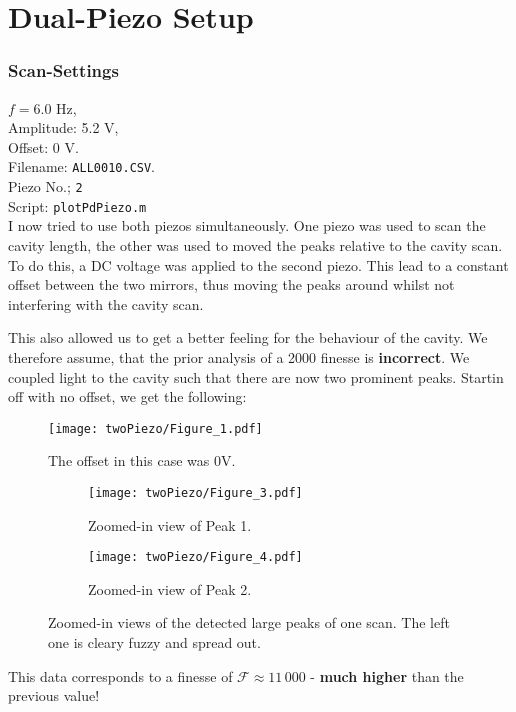 \section{Dual-Piezo Setup}
\subsubsection*{Scan-Settings}
$f = 6.0$ Hz,  \\
Amplitude: 5.2 V,  \\
Offset: 0 V.  \\
Filename: \texttt{ALL0010.CSV}.   \\
Piezo No.; \texttt{2}  \\
Script: \texttt{plotPdPiezo.m} \\

I now tried to use both piezos simultaneously. One piezo was used to scan the cavity length, the other was used to moved the peaks relative to the cavity scan.
To do this, a DC voltage was applied to the second piezo. This lead to a constant offset between the two mirrors, thus moving the peaks around whilst not interfering with the cavity scan.

This also allowed us to get a better feeling for the behaviour of the cavity. 
We therefore assume, that the prior analysis of a 2000 finesse is \textbf{incorrect}.
We coupled light to the cavity such that there are now two prominent peaks.
Startin off with no offset, we get the following:


\begin{figure}[H]
    \centering
    \texttt{[image: twoPiezo/Figure\_1.pdf]}
    \caption{The offset in this case was 0V.}
\end{figure}



\begin{figure}[H]
    \centering
    \begin{subfigure}[t]{0.48\textwidth}
        \centering
        \texttt{[image: twoPiezo/Figure\_3.pdf]}
        \caption{Zoomed-in view of Peak 1.}
        \label{fig:peak1_0v}
    \end{subfigure}
    \hfill
    \begin{subfigure}[t]{0.48\textwidth}
        \centering
        \texttt{[image: twoPiezo/Figure\_4.pdf]}
        \caption{Zoomed-in view of Peak 2.}
        \label{fig:peak2_0v}
    \end{subfigure}
    \caption{Zoomed-in views of the detected large peaks of one scan. The left one is cleary fuzzy and spread out.}
\end{figure}
This data corresponds to a finesse of $\mathcal{F}\approx11\,000$ - \textbf{much higher} than the previous value!
\newpage
